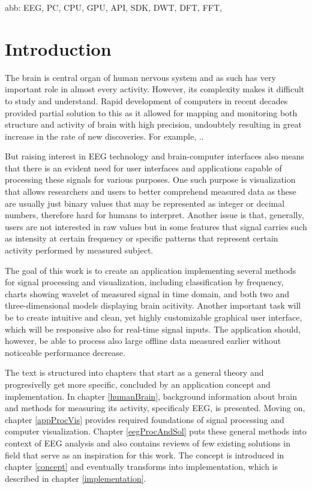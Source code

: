 abb:
EEG,
PC,
CPU,
GPU,
API,
SDK,
DWT,
DFT,
FFT,

\chapter{Introduction}
The brain is central organ of human nervous system and as such has very
important role in almost every activity. However, its complexity makes it
difficult to study and understand. Rapid development of computers in recent
decades provided partial solution to this as it allowed for mapping and
monitoring both structure and activity of brain with high precision,
undoubtely resulting in great increase in the rate of new discoveries. For
example, ..

But raising interest in EEG technology and brain-computer interfaces also means
that there is an evident need for user interfaces and applications capable of
processing these signals for various purposes. One such purpose is visualization
that allows researchers and users to better comprehend measured data as these
are usually just binary values that may be represented as integer or decimal
numbers, therefore hard for humans to interpret. Another issue is that,
generally, users are not interested in raw values but in some features that
signal carries such as intensity at certain frequency or specific patterns that
represent certain activity performed by measured subject.

The goal of this work is to create an application implementing several
methods for signal processing and visualization, including classification by
frequency, charts showing wavelet of measured signal in time domain, and both
two and three-dimensional models displaying brain acitivity. Another important
task will be to create intuitive and clean, yet highly customizable graphical
user interface, which will be responsive also for real-time signal inputs. The
application should, however, be able to process also large offline data measured
earlier without noticeable performance decrease.

The text is structured into chapters that start as a general theory and
progresivelly get more specific, concluded by an application concept and
implementation. In chapter \ref{humanBrain}, background information about brain
and methods for measuring its activity, specificaly EEG, is presented. Moving
on, chapter \ref{appProcVis} provides required foundations of signal processing
and computer visualization. Chapter \ref{eegProcAndSol} puts these general
methods into context of EEG analysis and also contains reviews of few existing
solutions in field that serve as an inspiration for this work. The concept is
introduced in chapter \ref{concept} and eventually transforms into
implementation, which is described in chapter \ref{implementation}.
 
